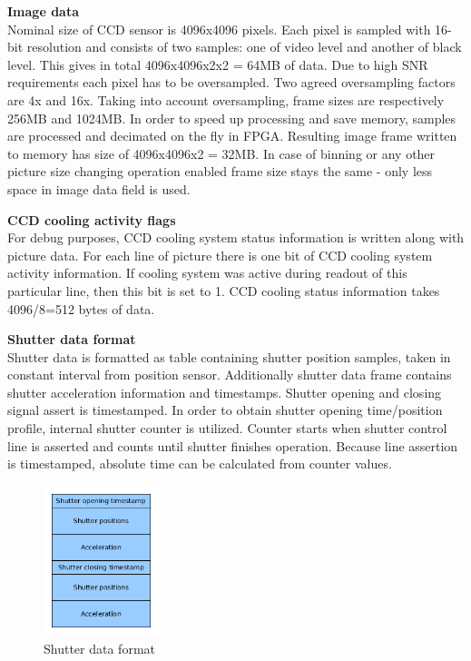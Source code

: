 \begin{description}
\item \textbf{Image data} \hfill \\
Nominal size of CCD sensor is 4096x4096 pixels. Each pixel is sampled with 16-bit resolution and consists of two samples: one of video level and another of black level. This gives in total 4096x4096x2x2 = 64MB of data. Due to high SNR requirements each pixel has to be oversampled. Two agreed oversampling factors are 4x and 16x. Taking into account oversampling, frame sizes are respectively 256MB and 1024MB. In order to speed up processing and save memory, samples are processed and decimated on the fly in FPGA. Resulting image frame written to memory has size of 4096x4096x2 = 32MB. In case of binning or any other picture size changing operation enabled frame size stays the same - only less space in image data field is used.

\item \textbf{CCD cooling activity flags} \hfill \\
For debug purposes, CCD cooling system status information is written along with picture data. For each line of picture there is one bit of CCD cooling system activity information. If cooling system was active during readout of this particular line, then this bit is set to 1. CCD cooling status information takes 4096/8=512 bytes of data.

\item \textbf{Shutter data format} \hfill \\
Shutter data is formatted as table containing shutter position samples, taken in constant interval from position sensor. Additionally shutter data frame contains shutter acceleration information and timestamps. Shutter opening and closing signal assert is timestamped. In order to obtain shutter opening time/position profile, internal shutter counter is utilized. Counter starts when shutter control line is asserted and counts until shutter finishes operation. Because line assertion is timestamped, absolute time can be calculated from counter values.
\end{description}

\begin{figure}[H]
\centering
\includegraphics[width=0.3\textwidth]{pict_ipc/shutter_format.png}
\caption{Shutter data format}
\label{fig:shutter_format}
\end{figure}

